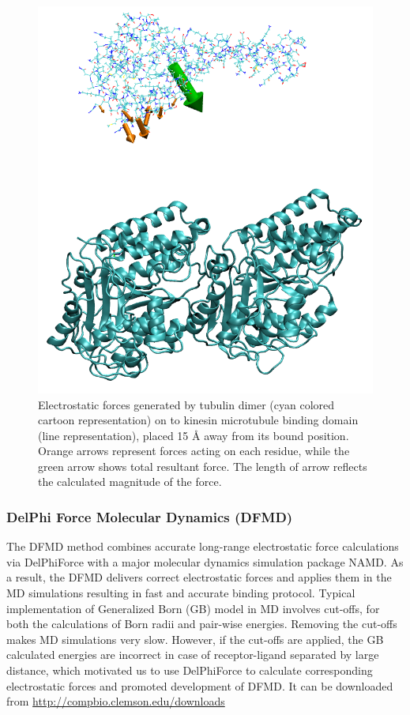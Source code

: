 \documentclass[9pt,tutorial,pubversion]{livecoms}
\begin{document}
\begin{figure}[hbt!]
\includegraphics[width=\linewidth]{Figure_14.png}
\caption{Electrostatic forces generated by tubulin dimer (cyan colored cartoon representation) on to kinesin microtubule binding domain (line representation), placed 15 $\text{\AA}$ away from its bound position. Orange arrows represent forces acting on each residue, while the green arrow shows total resultant force. The length of arrow reflects the calculated magnitude of the force.}
\label{fig:delphiforce}
\end{figure}

\subsubsection{DelPhi Force Molecular Dynamics (DFMD)}

The DFMD method\cite{peng2019DFMD} combines accurate long-range electrostatic force calculations via DelPhiForce with a major molecular dynamics simulation package NAMD\cite{phillips2005scalable}.  As a result, the DFMD delivers correct electrostatic forces and applies them in the MD simulations resulting in fast and accurate binding protocol. Typical implementation of Generalized Born (GB)\cite{onufriev2000modification} model in MD involves cut-offs, for both the calculations of Born radii and pair-wise energies. Removing the cut-offs makes MD simulations very slow. However, if the cut-offs are applied, the GB calculated energies are incorrect in case of receptor-ligand separated by large distance, which motivated us to use DelPhiForce to calculate corresponding electrostatic forces and promoted development of DFMD. It can be downloaded from \url{http://compbio.clemson.edu/downloads}
\end{document}
